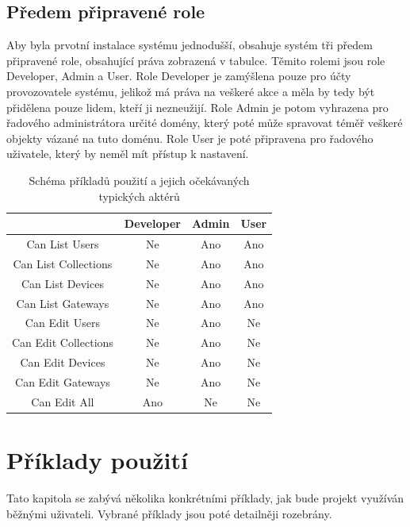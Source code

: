 \subsection{Předem připravené role}

Aby byla prvotní instalace systému jednodušší, obsahuje systém tři předem připravené role, obsahující práva zobrazená v tabulce. Těmito rolemi jsou role Developer, Admin a User. Role Developer je zamýšlena pouze pro účty provozovatele systému, jelikož má práva na veškeré akce a měla by tedy být přidělena pouze lidem, kteří ji nezneužijí. Role Admin je potom vyhrazena pro řadového administrátora určité domény, který poté může spravovat téměř veškeré objekty vázané na tuto doménu. Role User je poté připravena pro řadového uživatele, který by neměl mít přístup k nastavení.

\begin{table}[h!]
\centering
\begin{tabular}{|c|c|c|c|}
\hline
 & Developer & Admin & User \\ \hline
Can List Users & Ne & Ano & Ano \\ \hline
Can List Collections & Ne & Ano & Ano \\ \hline
Can List Devices & Ne & Ano & Ano \\ \hline
Can List Gateways & Ne & Ano & Ano \\ \hline
Can Edit Users & Ne & Ano & Ne \\ \hline
Can Edit Collections & Ne & Ano & Ne \\ \hline
Can Edit Devices & Ne & Ano & Ne \\ \hline
Can Edit Gateways & Ne & Ano & Ne \\ \hline
Can Edit All & Ano & Ne & Ne \\ \hline
\end{tabular}
\vspace{1em}
\caption{Schéma příkladů použití a jejich očekávaných typických aktérů}
\label{fig:my_label}
\end{table}

\section{Příklady použití}
Tato kapitola se zabývá několika konkrétními příklady, jak bude projekt využíván běžnými uživateli. Vybrané příklady jsou poté detailněji rozebrány. 

